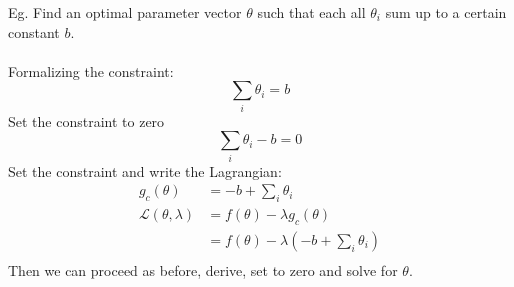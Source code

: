 \documentclass[a4paper,10pt]{article}
\begin{document}
\noindent Eg. Find an optimal parameter vector $\theta$ such that each all $\theta_{i}$ sum up to a certain constant $b$. \\\\
Formalizing the constraint: 
\begin{equation*}
	\sum_{i}\theta_{i} = b
\end{equation*}
Set the constraint to zero 
\begin{equation*}
	\sum_{i}\theta_{i} - b = 0 
\end{equation*}
Set the constraint and write the Lagrangian: 
\begin{align*}
	g_{c}(\theta) &= -b + \sum_{i}\theta_{i} \\
	\mathcal{L}(\theta, \lambda) &= f(\theta) - \lambda g_{c}(\theta) \\
	&= f(\theta) - \lambda(-b + \sum_{i}\theta_{i}) \\
\end{align*}
Then we can proceed as before, derive, set to zero and solve for $\theta$. 
\newpage
\end{document}
